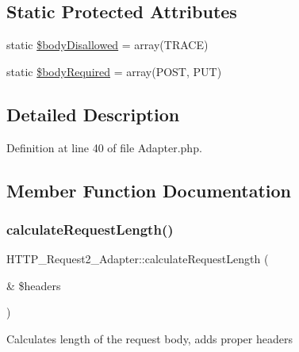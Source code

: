 \subsection*{Static Protected Attributes}
\begin{DoxyCompactItemize}
\item 
static \hyperlink{classHTTP__Request2__Adapter_aff1fdc6f36307d7e6febd29573741d33}{\$body\+Disallowed} = array(\textquotesingle{}T\+R\+A\+CE\textquotesingle{})
\item 
static \hyperlink{classHTTP__Request2__Adapter_a1c84e4f08fed2fdd4511ea12bf479595}{\$body\+Required} = array(\textquotesingle{}P\+O\+ST\textquotesingle{}, \textquotesingle{}P\+UT\textquotesingle{})
\end{DoxyCompactItemize}


\subsection{Detailed Description}


Definition at line 40 of file Adapter.\+php.



\subsection{Member Function Documentation}
\mbox{\label{classHTTP__Request2__Adapter_a046d93dce3a7735a7cc0e4564593de5d}} 
\subsubsection{\texorpdfstring{calculate\+Request\+Length()}{calculateRequestLength()}}
{\footnotesize\ttfamily H\+T\+T\+P\+\_\+\+Request2\+\_\+\+Adapter\+::calculate\+Request\+Length (\begin{DoxyParamCaption}\item[{\&}]{\$headers }\end{DoxyParamCaption})\hspace{0.3cm}{\ttfamily [protected]}}

Calculates length of the request body, adds proper headers


